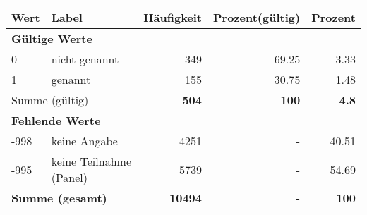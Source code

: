      \begin{longtable}{lXrrr}
     \toprule
     \textbf{Wert} & \textbf{Label} & \textbf{Häufigkeit} & \textbf{Prozent(gültig)} & \textbf{Prozent} \\
     \endhead
     \midrule
     \multicolumn{5}{l}{\textbf{Gültige Werte}}\\

     0 &
     \multicolumn{1}{X}{ nicht genannt   } &


       \num{349} &
       \num[round-mode=places,round-precision=2]{69.25} &
         \num[round-mode=places,round-precision=2]{3.33} \\

     1 &
     \multicolumn{1}{X}{ genannt   } &


       \num{155} &
       \num[round-mode=places,round-precision=2]{30.75} &
         \num[round-mode=places,round-precision=2]{1.48} \\
     \midrule
     \multicolumn{2}{l}{Summe (gültig)} &
       \textbf{\num{504}} &
     \textbf{\num{100}} &
       \textbf{\num[round-mode=places,round-precision=2]{4.8}} \\
     \multicolumn{5}{l}{\textbf{Fehlende Werte}}\\
       -998 &
       keine Angabe &
         \num{4251} &
        - &
         \num[round-mode=places,round-precision=2]{40.51} \\
       -995 &
       keine Teilnahme (Panel) &
         \num{5739} &
        - &
         \num[round-mode=places,round-precision=2]{54.69} \\
     \midrule
     \multicolumn{2}{l}{\textbf{Summe (gesamt)}} &
          \textbf{\num{10494}} &
        \textbf{-} &
        \textbf{\num{100}} \\
     \bottomrule
     \end{longtable}
     
